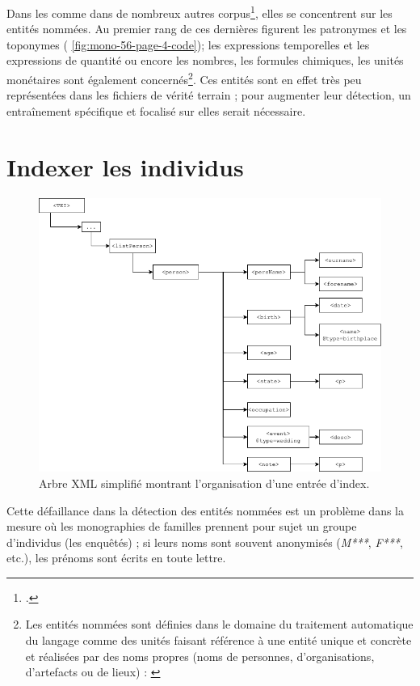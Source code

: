 Dans les \odm{} comme dans de nombreux autres corpus\footcite[p. 1]{sagot}, elles se concentrent sur les entités nommées. Au premier rang de ces dernières figurent les patronymes et les toponymes (\fig{} \ref{fig:mono-56-page-4-code}); les \og expressions temporelles et les expressions de quantité \fg{} ou encore \og les nombres, les formules chimiques, les unités monétaires \fg{} sont également concernés\footnote{Les entités nommées sont définies dans le domaine du traitement automatique du langage comme des \og unités faisant référence à une entité unique et concrète et réalisées par des noms propres (noms de personnes, d’organisations, d’artefacts ou de lieux) \fg{} : \cite[p. 4]{sagot}}. Ces entités sont en effet très peu représentées dans les fichiers de vérité terrain ; pour augmenter leur détection, un entraînement spécifique et focalisé sur elles serait nécessaire.

\section{Indexer les individus}

\begin{figure}[h]
    \centering
    \includegraphics[width=16cm]{img/index_tree.png}
    \caption{Arbre XML simplifié montrant l'organisation d'une entrée d'index.}
    \label{fig:index_tree}
\end{figure}

Cette défaillance dans la détection des entités nommées est un problème dans la mesure où les monographies de familles prennent pour sujet un groupe d'individus (les enquêtés) ; si leurs noms sont souvent anonymisés (\textit{M***}, \textit{F***}, etc.), les prénoms sont écrits en toute lettre.

